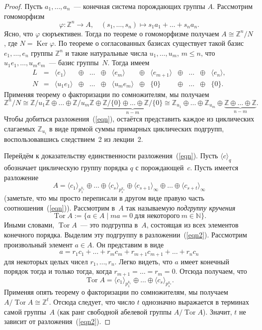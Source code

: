 \documentclass[a4paper,10pt]{amsart}
\newcommand{\Ker}{\mathop{\mathrm{Ker}}}
\DeclareMathOperator{\Tor}{\mathrm{Tor}}
\def\ZZ{{\mathbb Z}}%
\def\NN{{\mathbb N}}%
\theoremstyle{definition}
\theoremstyle{remark}
\begin{document}
\begin{proof}
Пусть $a_1,\ldots,a_n$~--- конечная система порождающих группы $A$.
Рассмотрим гомоморфизм
$$
\varphi \colon \ZZ^n \to A, \quad (s_1, \ldots, s_n) \mapsto s_1 a_1
+ \ldots + s_n a_n.
$$
Ясно, что $\varphi$ сюръективен. Тогда по теореме о гомоморфизме
получаем $A \cong \ZZ^n / N$, где $N = \Ker \varphi$. По теореме о
согласованных базисах существует такой базис $e_1, \ldots, e_n$
группы $\ZZ^n$ и такие натуральные числа $u_1, \ldots, u_m$, $m
\leqslant n$, что $u_1 e_1, \ldots, u_m e_m$~--- базис группы~$N$.
Тогда имеем
$$
\begin{array}{ccccccccccccc}
L &=& \langle e_1 \rangle &\oplus & \ldots & \oplus & \langle e_m
\rangle & \oplus & \langle e_{m+1} \rangle & \oplus & \ldots &
\oplus & \langle e_n \rangle, \\
N &=& \langle u_1e_1 \rangle & \oplus & \ldots & \oplus & \langle
u_m e_m \rangle &\oplus & \lbrace 0 \rbrace & \oplus & \ldots &
\oplus & \lbrace 0 \rbrace.
\end{array}
$$
Применяя теорему о факторизации по сомножителям, мы получаем
$$
\ZZ^n / N \cong \ZZ / u_1 \ZZ \oplus \ldots \oplus \ZZ / u_m \ZZ
\oplus \underbrace{\ZZ / \lbrace 0 \rbrace \oplus \ldots \oplus \ZZ
/ \lbrace 0 \rbrace}_{n-m} \cong \ZZ_{u_1} \oplus \ldots \oplus
\ZZ_{u_m} \oplus \underbrace{\ZZ \oplus \ldots \oplus \ZZ}_{n-m}.
$$
Чтобы добиться разложения~(\ref{eqn}), остаётся представить каждое
из циклических слагаемых $\ZZ_{u_i}$ в виде прямой суммы примарных
циклических подгрупп, воспользовавшись следствием~2 из лекции~2.

Перейдём к доказательству единственности разложения~(\ref{eqn}).
Пусть $\langle c \rangle_q$ обозначает циклическую группу порядка
$q$ с порождающей~$c$. Пусть имеется разложение
\begin{equation} \label{eqn2}
A = \langle c_1\rangle_{p_1^{k_1}} \oplus \ldots \oplus \langle c_s
\rangle_{p_s^{k_s}} \oplus \langle c_{s+1} \rangle_{\infty} \oplus
\ldots \oplus \langle c_{s+t} \rangle_{\infty}
\end{equation}
(заметьте, что мы просто переписали в другом виде правую часть
соотношения~(\ref{eqn})). Рассмотрим в~$A$ так называемую {\it
подгруппу кручения}
$$
\Tor A := \{ a \in A \mid ma=0 \ \text{для некоторого} \ m \in \NN
\}.
$$
Иными словами, $\Tor A$~--- это подгруппа в~$A$, состоящая из всех
элементов конечного порядка. Выделим эту подгруппу в
разложении~(\ref{eqn2}). Рассмотрим произвольный элемент $a \in A$.
Он представим в виде
$$
a = r_1c_1 + \ldots + r_m c_m + r_{m+1} c_{m+1} + \ldots + r_n c_n
$$
для некоторых целых чисел $r_1, \ldots, r_n$. Легко видеть, что $a$
имеет конечный порядок тогда и только тогда, когда $r_{m+1} = \ldots
= r_m = 0$. Отсюда получаем, что
\begin{equation} \label{eqn3}
\Tor A = \langle c_1 \rangle_{p_1^{k_1}} \oplus \ldots \oplus
\langle c_s \rangle_{p_s^{k_s}}.
\end{equation}
Применяя опять теорему о факторизации по сомножителям, мы получаем
$A / \Tor A \cong \ZZ^t$. Отсюда следует, что число $t$ однозначно
выражается в терминах самой группы~$A$ (как ранг свободной абелевой
группы $A / \Tor A$). Значит, $t$ не зависит от
разложения~(\ref{eqn2}).


\end{proof}
\end{document}
